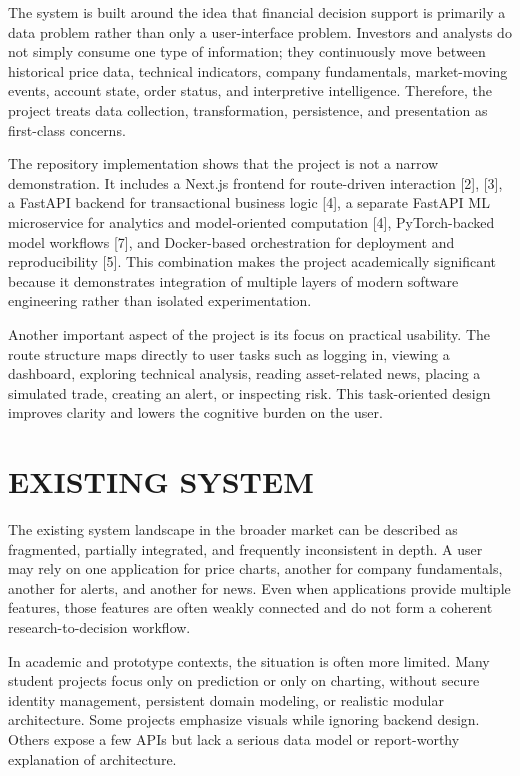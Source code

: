 \documentclass[12pt,a4paper]{report}
\begin{document}
The system is built around the idea that financial decision support is primarily a data problem rather than only a user-interface problem. Investors and analysts do not simply consume one type of information; they continuously move between historical price data, technical indicators, company fundamentals, market-moving events, account state, order status, and interpretive intelligence. Therefore, the project treats data collection, transformation, persistence, and presentation as first-class concerns.

The repository implementation shows that the project is not a narrow demonstration. It includes a Next.js frontend for route-driven interaction [2], [3], a FastAPI backend for transactional business logic [4], a separate FastAPI ML microservice for analytics and model-oriented computation [4], PyTorch-backed model workflows [7], and Docker-based orchestration for deployment and reproducibility [5]. This combination makes the project academically significant because it demonstrates integration of multiple layers of modern software engineering rather than isolated experimentation.

Another important aspect of the project is its focus on practical usability. The route structure maps directly to user tasks such as logging in, viewing a dashboard, exploring technical analysis, reading asset-related news, placing a simulated trade, creating an alert, or inspecting risk. This task-oriented design improves clarity and lowers the cognitive burden on the user.

\section{EXISTING SYSTEM}
The existing system landscape in the broader market can be described as fragmented, partially integrated, and frequently inconsistent in depth. A user may rely on one application for price charts, another for company fundamentals, another for alerts, and another for news. Even when applications provide multiple features, those features are often weakly connected and do not form a coherent research-to-decision workflow.

In academic and prototype contexts, the situation is often more limited. Many student projects focus only on prediction or only on charting, without secure identity management, persistent domain modeling, or realistic modular architecture. Some projects emphasize visuals while ignoring backend design. Others expose a few APIs but lack a serious data model or report-worthy explanation of architecture.
\end{document}
